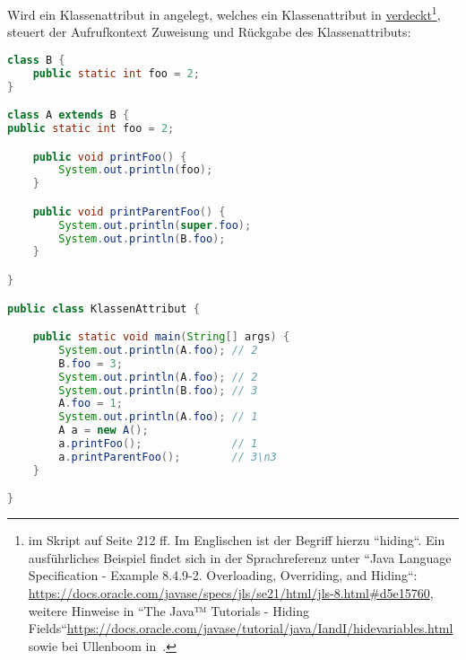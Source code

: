 Wird ein Klassenattribut in  angelegt, welches ein Klassenattribut in  \underline{verdeckt}\footnote{
    im Skript auf Seite 212 ff.
    Im Englischen ist der Begriff hierzu ``hiding``.
    Ein ausführliches Beispiel findet sich in der Sprachreferenz unter ``Java Language Specification - Example 8.4.9-2. Overloading, Overriding, and Hiding``:
    \url{https://docs.oracle.com/javase/specs/jls/se21/html/jls-8.html#d5e15760},
    weitere Hinweise in ``The Java™ Tutorials - Hiding Fields``\url{https://docs.oracle.com/javase/tutorial/java/IandI/hidevariables.html} sowie
    bei Ullenboom in~\cite[483 ff.]{Ull12}.
}, steuert der Aufrufkontext Zuweisung und Rückgabe des Klassenattributs:

\begin{lstlisting}[language=java]
class B {
    public static int foo = 2;
}

class A extends B {
public static int foo = 2;

    public void printFoo() {
        System.out.println(foo);
    }

    public void printParentFoo() {
        System.out.println(super.foo);
        System.out.println(B.foo);
    }

}

public class KlassenAttribut {

    public static void main(String[] args) {
        System.out.println(A.foo); // 2
        B.foo = 3;
        System.out.println(A.foo); // 2
        System.out.println(B.foo); // 3
        A.foo = 1;
        System.out.println(A.foo); // 1
        A a = new A();
        a.printFoo();              // 1
        a.printParentFoo();        // 3\n3
    }

}
\end{lstlisting}
